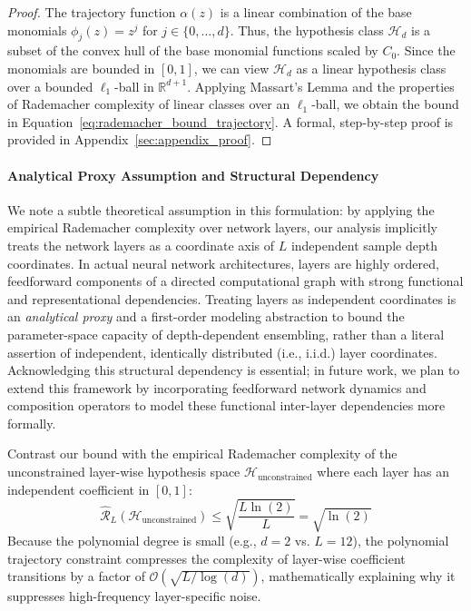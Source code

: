 \begin{proof}
The trajectory function $\alpha(z)$ is a linear combination of the base monomials $\phi_j(z) = z^j$ for $j \in \{0, \dots, d\}$. Thus, the hypothesis class $\mathcal{H}_d$ is a subset of the convex hull of the base monomial functions scaled by $C_0$. Since the monomials are bounded in $[0, 1]$, we can view $\mathcal{H}_d$ as a linear hypothesis class over a bounded $\ell_1$-ball in $\mathbb{R}^{d+1}$. Applying Massart's Lemma and the properties of Rademacher complexity of linear classes over an $\ell_1$-ball, we obtain the bound in Equation~\ref{eq:rademacher_bound_trajectory}. A formal, step-by-step proof is provided in Appendix~\ref{sec:appendix_proof}.
\end{proof}

\paragraph{Analytical Proxy Assumption and Structural Dependency}
We note a subtle theoretical assumption in this formulation: by applying the empirical Rademacher complexity over network layers, our analysis implicitly treats the network layers as a coordinate axis of $L$ independent sample depth coordinates. In actual neural network architectures, layers are highly ordered, feedforward components of a directed computational graph with strong functional and representational dependencies. Treating layers as independent coordinates is an \emph{analytical proxy} and a first-order modeling abstraction to bound the parameter-space capacity of depth-dependent ensembling, rather than a literal assertion of independent, identically distributed (i.e., i.i.d.) layer coordinates. Acknowledging this structural dependency is essential; in future work, we plan to extend this framework by incorporating feedforward network dynamics and composition operators to model these functional inter-layer dependencies more formally.

Contrast our bound with the empirical Rademacher complexity of the unconstrained layer-wise hypothesis space $\mathcal{H}_{\text{unconstrained}}$ where each layer has an independent coefficient in $[0, 1]$:
\begin{equation}
\widehat{\mathcal{R}}_L(\mathcal{H}_{\text{unconstrained}}) \le \sqrt{\frac{L \ln(2)}{L}} = \sqrt{\ln(2)}
\end{equation}
Because the polynomial degree is small (e.g., $d = 2$ vs. $L = 12$), the polynomial trajectory constraint compresses the complexity of layer-wise coefficient transitions by a factor of $\mathcal{O}(\sqrt{L / \log(d)})$, mathematically explaining why it suppresses high-frequency layer-specific noise.

